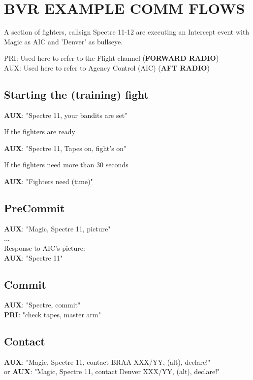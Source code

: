 \section{BVR EXAMPLE COMM FLOWS}

A section of fighters, callsign Spectre 11-12 are executing an Intercept event
with Magic as AIC and 'Denver' as bullseye.

{\color{red}PRI}: Used here to refer to the Flight channel (\textbf{FORWARD
RADIO}) \\
{\color{red}AUX}: Used here to refer to Agency Control (AIC) (\textbf{AFT
RADIO})

\subsection*{Starting the (training) fight}

\textbf{AUX}: "Spectre 11, your bandits are set"

If the fighters are ready

\textbf{AUX}: "Spectre 11, Tapes on, fight's on"

If the fighters need more than 30 seconds

\textbf{AUX}: "Fighters need (time)"

\subsection*{PreCommit}

\textbf{AUX}: "Magic, Spectre 11, picture"\\
...\\
Response to AIC's picture:\\
\textbf{AUX}: "Spectre 11"

\subsection*{Commit}

\textbf{AUX}: "Spectre, commit"\\
\textbf{PRI}: "check tapes, master arm"

\subsection{Contact}

\textbf{AUX}: "Magic, Spectre 11, contact BRAA XXX/YY, (alt), declare!"\\
or
\textbf{AUX}: "Magic, Spectre 11, contact Denver XXX/YY, (alt), declare!"

